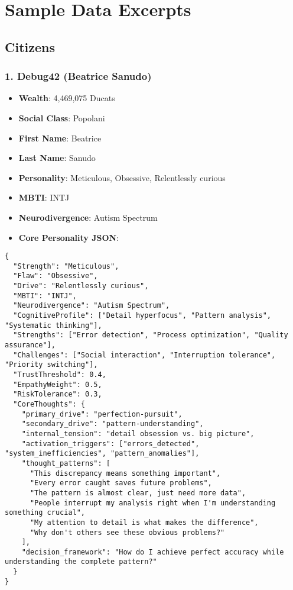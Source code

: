 \documentclass[11pt,a4paper]{article}
\begin{document}
\section{Sample Data Excerpts}

\subsection{Citizens}

\subsubsection{1. Debug42 (Beatrice Sanudo)}

\begin{itemize}
\item \textbf{Wealth}: 4,469,075 Ducats
\item \textbf{Social Class}: Popolani
\item \textbf{First Name}: Beatrice
\item \textbf{Last Name}: Sanudo
\item \textbf{Personality}: Meticulous, Obsessive, Relentlessly curious
\item \textbf{MBTI}: INTJ
\item \textbf{Neurodivergence}: Autism Spectrum
\item \textbf{Core Personality JSON}:
\end{itemize}

\begin{lstlisting}
{
  "Strength": "Meticulous",
  "Flaw": "Obsessive", 
  "Drive": "Relentlessly curious",
  "MBTI": "INTJ",
  "Neurodivergence": "Autism Spectrum",
  "CognitiveProfile": ["Detail hyperfocus", "Pattern analysis", "Systematic thinking"],
  "Strengths": ["Error detection", "Process optimization", "Quality assurance"],
  "Challenges": ["Social interaction", "Interruption tolerance", "Priority switching"],
  "TrustThreshold": 0.4,
  "EmpathyWeight": 0.5,
  "RiskTolerance": 0.3,
  "CoreThoughts": {
    "primary_drive": "perfection-pursuit",
    "secondary_drive": "pattern-understanding", 
    "internal_tension": "detail obsession vs. big picture",
    "activation_triggers": ["errors_detected", "system_inefficiencies", "pattern_anomalies"],
    "thought_patterns": [
      "This discrepancy means something important",
      "Every error caught saves future problems",
      "The pattern is almost clear, just need more data",
      "People interrupt my analysis right when I'm understanding something crucial",
      "My attention to detail is what makes the difference",
      "Why don't others see these obvious problems?"
    ],
    "decision_framework": "How do I achieve perfect accuracy while understanding the complete pattern?"
  }
}
\end{lstlisting}
\end{document}
